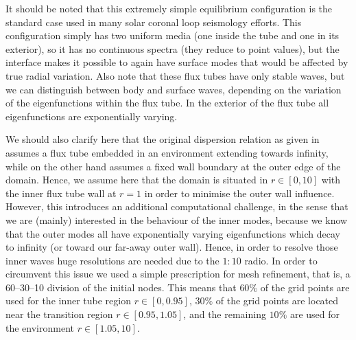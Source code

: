It should be noted that this extremely simple equilibrium configuration is the standard case used in many solar coronal loop seismology efforts. This configuration simply has two uniform media (one inside the tube and one in its exterior), so it has no continuous spectra (they reduce to point values), but the interface makes it possible to again have surface modes that would be affected by true radial variation. Also note that these flux tubes have only stable waves, but we can distinguish between body and surface waves, depending on the variation of the eigenfunctions within the flux tube. In the exterior of the flux tube all eigenfunctions are exponentially varying.

We should also clarify here that the original dispersion relation as given in \citet{book_roberts} assumes a flux tube embedded in an environment extending towards infinity, while {\legolas} on the other hand assumes a fixed wall boundary at the outer edge of the domain. Hence, we assume here that the domain is situated in $r \in [0, 10]$ with the inner flux tube wall at $r = 1$ in order to minimise the outer wall influence. However, this introduces an additional computational challenge, in the sense that we are (mainly) interested in the behaviour of the inner modes, because we know that the outer modes all have exponentially varying eigenfunctions which decay to infinity (or toward our far-away outer wall). Hence, in order to resolve those inner waves huge resolutions are needed due to the $1:10$ radio. In order to circumvent this issue we used a simple prescription for mesh refinement, that is, a 60--30--10 division of the initial nodes. This means that $60\%$ of the grid points are used for the inner tube region $r \in [0, 0.95]$, $30\%$ of the grid points are located near the transition region $r \in [0.95, 1.05]$, and the remaining $10\%$ are used for the environment $r \in [1.05, 10]$.

